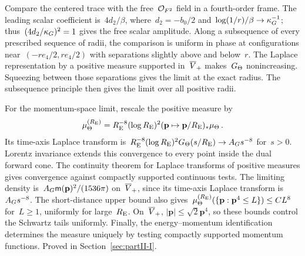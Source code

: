 Compare the centered trace with the free~$\mathcal{O}_{F^2}$ field in a fourth-order frame. The leading scalar coefficient is~$4d_2/\beta$, where~$d_2=-b_0/2$ and~$\log(1/r)/\beta\to\kappa_G^{-1}$; thus~$(4d_2/\kappa_G)^2=1$ gives the free scalar amplitude. Along a subsequence of every prescribed sequence of radii, the comparison is uniform in phase at configurations near~$(-re_4/2,re_4/2)$ with separations slightly above and below~$r$. The Laplace representation by a positive measure supported in~$\overline{V}_+$ makes~$G_{\Theta}$ nonincreasing. Squeezing between those separations gives the limit at the exact radius. The subsequence principle then gives the limit over all positive radii.

For the momentum-space limit, rescale the positive measure by
\begin{equation}\label{eq:P10-rescaled}
\mu_\Theta^{(R_{\rm E})}=R_{\rm E}^{-8}(\log R_{\rm E})^2(\mathbf p\mapsto\mathbf p/R_{\rm E})_*\mu_{\Theta}\,.
\end{equation}
Its time-axis Laplace transform is~$R_{\rm E}^{-8}(\log R_{\rm E})^2G_{\Theta}(s/R_{\rm E})\to A_G s^{-8}$ for~$s>0$. Lorentz invariance extends this convergence to every point inside the dual forward cone. The continuity theorem for Laplace transforms of positive measures gives convergence against compactly supported continuous tests. The limiting density is~$A_G\mathsf{m}(\mathbf p)^2/(1536\pi)$ on~$\overline{V}_+$, since its time-axis Laplace transform is~$A_G s^{-8}$. The short-distance upper bound also gives~$\mu_\Theta^{(R_{\rm E})}(\{\mathbf p:\mathbf p^4\le L\})\le CL^8$ for~$L\ge1$, uniformly for large~$R_{\rm E}$. On~$\overline{V}_+$, $|\mathbf p|\le\sqrt2\mathbf p^4$, so these bounds control the Schwartz tails uniformly. Finally, the energy--momentum identification determines the measure uniquely by testing compactly supported momentum functions. Proved in Section~\ref{sec:partII-I}.

